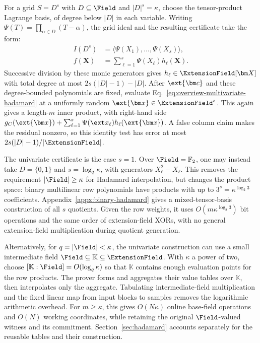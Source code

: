 For a grid \(S=D^s\) with \(D\subseteq\Field\) and
\(|D|^s=\kappa\), choose the tensor-product Lagrange basis,
of degree below \(|D|\) in each variable.
Writing \(\Psi(T)=\prod_{\alpha\in D}(T-\alpha)\), the grid ideal
and the resulting certificate take the form:
\begin{equation}
\begin{aligned}
    I(D^s)&=\langle\Psi(X_1),\ldots,\Psi(X_s)\rangle,\\
    f(\bm X)&=\sum_{\ell=1}^s\Psi(X_\ell)h_\ell(\bm X).
\end{aligned}
\label{eq:overview-multivariate-hadamard}
\end{equation}
Successive division by these monic generators gives
\(h_\ell\in\ExtensionField[\bm X]\) with total degree at most
\(2s(|D|-1)-|D|\).
After \(\ext{\bm c}\) and these degree-bounded polynomials are
fixed, evaluate Eq.~\eqref{eq:overview-multivariate-hadamard}
at a uniformly random \(\ext{\bm x}\in\ExtensionField^s\).
This again gives a length-\(m\) inner product, with right-hand
side \(g_C(\ext{\bm x})+
\sum_{\ell=1}^s\Psi(\ext x_\ell)h_\ell(\ext{\bm x})\).
A false column claim makes the residual nonzero, so this
identity test has error at most
\(2s(|D|-1)/|\ExtensionField|\).

The univariate certificate is the case \(s=1\).
Over \(\Field=\mathbb F_2\), one may instead take
\(D=\{0,1\}\) and \(s=\log_2\kappa\), with generators
\(X_\ell^2-X_\ell\).
This removes the requirement \(|\Field|\geq\kappa\) for
Hadamard interpolation, but changes the product space: binary multilinear
row polynomials have products with up to
\(3^s=\kappa^{\log_2 3}\) coefficients.
Appendix~\ref{appx:binary-hadamard} gives a mixed-tensor-basis
construction of all \(s\) quotients. Given the row weights, it
uses \(O(m\kappa^{\log_2 3})\) bit operations and the same order
of extension-field XORs, with no general extension-field
multiplication during quotient generation.

Alternatively, for \(q=|\Field|<\kappa\), the univariate
construction can use a small intermediate field
\(\Field\subseteq\mathbb K\subseteq\ExtensionField\).
With \(\kappa\) a power of two, choose
\([\mathbb K:\Field]=O(\log_q\kappa)\) so that
\(\mathbb K\) contains enough evaluation points for the row
products. The prover forms and aggregates their value tables
over \(\mathbb K\), then interpolates only the aggregate.
Tabulating intermediate-field multiplication and the fixed
linear map from input blocks to samples removes the logarithmic
arithmetic overhead. For \(m\geq\kappa\), this gives
\(O(N\kappa)\) online base-field operations and \(O(N)\)
working coordinates, while retaining the original
\(\Field\)-valued witness and its commitment.
Section~\ref{sec:hadamard} accounts separately for the reusable
tables and their construction.


